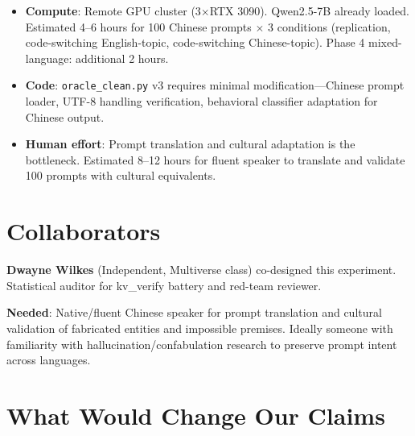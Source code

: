 \documentclass[11pt,letterpaper]{article}
\begin{document}
\begin{itemize}
  \item \textbf{Compute}: Remote GPU cluster (3$\times$RTX 3090). Qwen2.5-7B already loaded. Estimated 4--6 hours for 100 Chinese prompts $\times$ 3 conditions (replication, code-switching English-topic, code-switching Chinese-topic). Phase 4 mixed-language: additional 2 hours.
  \item \textbf{Code}: \texttt{oracle\_clean.py} v3 requires minimal modification---Chinese prompt loader, UTF-8 handling verification, behavioral classifier adaptation for Chinese output.
  \item \textbf{Human effort}: Prompt translation and cultural adaptation is the bottleneck. Estimated 8--12 hours for fluent speaker to translate and validate 100 prompts with cultural equivalents.
\end{itemize}

\section{Collaborators}

\textbf{Dwayne Wilkes} (Independent, Multiverse class) co-designed this experiment. Statistical auditor for kv\_verify battery and red-team reviewer.

\textbf{Needed}: Native/fluent Chinese speaker for prompt translation and cultural validation of fabricated entities and impossible premises. Ideally someone with familiarity with hallucination/confabulation research to preserve prompt intent across languages.

\section{What Would Change Our Claims}
\end{document}
